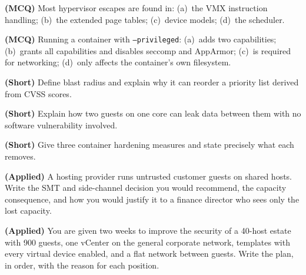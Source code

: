 \begin{reviewq}
  \item \textbf{(MCQ)} Most hypervisor escapes are found in: (a)~the VMX
        instruction handling; (b)~the extended page tables; (c)~device models;
        (d)~the scheduler.
  \item \textbf{(MCQ)} Running a container with \texttt{--privileged}:
        (a)~adds two capabilities; (b)~grants all capabilities and disables
        seccomp and AppArmor; (c)~is required for networking; (d)~only affects
        the container's own filesystem.
  \item \textbf{(Short)} Define blast radius and explain why it can reorder a
        priority list derived from CVSS scores.
  \item \textbf{(Short)} Explain how two guests on one core can leak data
        between them with no software vulnerability involved.
  \item \textbf{(Short)} Give three container hardening measures and state
        precisely what each removes.
  \item \textbf{(Applied)} A hosting provider runs untrusted customer guests on
        shared hosts. Write the SMT and side-channel decision you would
        recommend, the capacity consequence, and how you would justify it to a
        finance director who sees only the lost capacity.
  \item \textbf{(Applied)} You are given two weeks to improve the security of a
        40-host estate with 900 guests, one vCenter on the general corporate
        network, templates with every virtual device enabled, and a flat
        network between guests. Write the plan, in order, with the reason for
        each position.
\end{reviewq}
